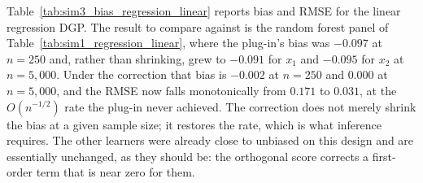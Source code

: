 \documentclass[12pt,a4paper]{article}
\numberwithin{equation}{section}
\theoremstyle{plain}
\theoremstyle{definition}
\begin{document}
	Table~\ref{tab:sim3_bias_regression_linear} reports bias and RMSE for the linear regression DGP. The result to compare against is the random forest panel of Table~\ref{tab:sim1_regression_linear}, where the plug-in's bias was $-0.097$ at $n=250$ and, rather than shrinking, grew to $-0.091$ for $x_1$ and $-0.095$ for $x_2$ at $n=5{,}000$. Under the correction that bias is $-0.002$ at $n=250$ and $0.000$ at $n=5{,}000$, and the RMSE now falls monotonically from $0.171$ to $0.031$, at the $O(n^{-1/2})$ rate the plug-in never achieved. The correction does not merely shrink the bias at a given sample size; it restores the rate, which is what inference requires. The other learners were already close to unbiased on this design and are essentially unchanged, as they should be: the orthogonal score corrects a first-order term that is near zero for them.
	
\end{document}
